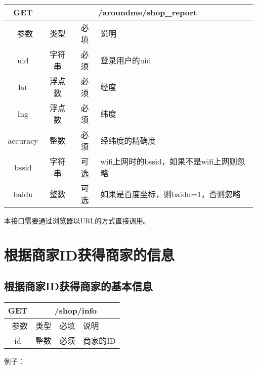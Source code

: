 \documentclass[cs4size]{ctexartutf8}
\begin{document}
\begin{table}[H]
   \begin{center}
\begin{tabular}{|c|c|c|p{12cm}|}
\hline
GET & \multicolumn{3}{|c|}{/aroundme/shop\_report} \\
\hline\hline
 \  参数  & 类型 & 必填 &  说明  \\
 \hline
 uid  & 字符串 & 必须 & 登录用户的uid\\
\hline
 lat  & 浮点数 & 必须 & 经度\\
\hline
 lng  &  浮点数 & 必须 & 纬度\\ 
\hline
 accuracy  & 整数 & 必须 & 经纬度的精确度\\ 
\hline
 bssid  & 字符串 & 可选 & wifi上网时的bssid，如果不是wifi上网则忽略\\  
\hline
 baidu  & 整数 & 可选 & 如果是百度坐标，则baidu=1，否则忽略\\  
\hline
\end{tabular}
   \end{center}
\end{table}

本接口需要通过浏览器以URL的方式直接调用。



\section{根据商家ID获得商家的信息}
\subsection{根据商家ID获得商家的基本信息}

\begin{table}[H]
   \begin{center}
\begin{tabular}{|c|c|c|p{12cm}|}
\hline
GET & \multicolumn{3}{|c|}{/shop/info} \\
\hline\hline
 \  参数  & 类型 & 必填 &  说明  \\
\hline
 id  & 整数 & 必须 & 商家的ID\\
\hline
\end{tabular}
   \end{center}
\end{table}

例子：
\end{document}
